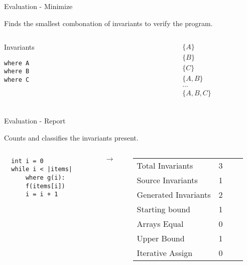 \begin{frame}[fragile]{Evaluation - Minimize}

Finds the smallest combonation of invariants to verify
the program.

\begin{columns}
\begin{column}{0.4\textwidth}
\begin{block}{Invariants}
\begin{verbatim}
where A
where B
where C
\end{verbatim}
\end{block}
\end{column}
\begin{column}{0.4\textwidth}
\begin{align*}
    &\{ A \} \\
    &\{ B \} \\
    &\{ C \} \\
    &\{ A, B \} \\
    &... \\
    &\{ A, B, C \} \\
\end{align*}
\end{column}
\end{columns}

\end{frame}

\begin{frame}[fragile]{Evaluation - Report}

Counts and classifies the invariants present.

\begin{columns}
\begin{column}{0.4\textwidth}
\begin{verbatim}
  int i = 0
  while i < |items|
      where g(i):
      f(items[i])
      i = i + 1
\end{verbatim}
\end{column}

\begin{column}{0.1\textwidth}
    \[\rightarrow\]
\end{column}

\begin{column}{0.5\textwidth}
\begin{longtable}[]{@{}llll@{}}
\midrule
\endhead
Total Invariants & 3\tabularnewline
Source Invariants & 1\tabularnewline
Generated Invariants & 2\tabularnewline
Starting bound & 1\tabularnewline
Arrays Equal & 0\tabularnewline
Upper Bound & 1\tabularnewline
Iterative Assign & 0\tabularnewline
\bottomrule
\end{longtable}


\end{column}
\end{columns}

\end{frame}



